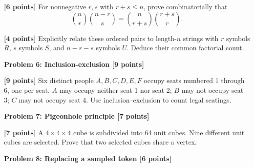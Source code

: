 \documentclass[12pt,letterpaper]{article}
\newcommand{\problemheading}[2][5\baselineskip]{\Needspace{#1}\par\noindent\hspace*{-0.625in}\textbf{#2}\par\nobreak\vspace{0.3em}}
\newcommand{\examspace}[1]{\par\vspace*{#1cm}}
\begin{document}
\begin{list}{}{\setlength{\leftmargin}{0.25in}\setlength{\rightmargin}{0.25in}}\item[]
\begin{description}[font=\normalfont,leftmargin=1.2em,labelsep=0.4em]
\item[(a)] \textbf{[6 points]} For nonnegative $r,s$ with $r+s\le n$, prove combinatorially that\[\binom nr\binom{n-r}{s}=\binom n{r+s}\binom{r+s}{r}.\]
\examspace{5}
\Needspace{\dimexpr 4cm+4\baselineskip\relax}
\item[(b)] \textbf{[4 points]} Explicitly relate these ordered pairs to length-$n$ strings with $r$ symbols $R$, $s$ symbols $S$, and $n-r-s$ symbols $U$. Deduce their common factorial count.
\examspace{4}
\end{description}
\end{list}
\clearpage
\vspace*{0.21in}
\problemheading{Problem 6: Inclusion-exclusion [9 points]}
\begin{list}{}{\setlength{\leftmargin}{0.25in}\setlength{\rightmargin}{0.25in}}\item[]
\begin{description}[font=\normalfont,leftmargin=1.2em,labelsep=0.4em]
\item[] \textbf{[9 points]} Six distinct people $A,B,C,D,E,F$ occupy seats numbered 1 through 6, one per seat. $A$ may occupy neither seat 1 nor seat 2; $B$ may not occupy seat 3; $C$ may not occupy seat 4. Use inclusion--exclusion to count legal seatings.
\examspace{7}
\end{description}
\end{list}
\clearpage
\vspace*{0.21in}
\problemheading{Problem 7: Pigeonhole principle [7 points]}
\begin{list}{}{\setlength{\leftmargin}{0.25in}\setlength{\rightmargin}{0.25in}}\item[]
\begin{description}[font=\normalfont,leftmargin=1.2em,labelsep=0.4em]
\item[] \textbf{[7 points]} A $4\times4\times4$ cube is subdivided into 64 unit cubes. Nine different unit cubes are selected. Prove that two selected cubes share a vertex.
\examspace{7}
\end{description}
\end{list}
\clearpage
\vspace*{0.21in}
\problemheading{Problem 8: Replacing a sampled token [6 points]}
\end{document}
